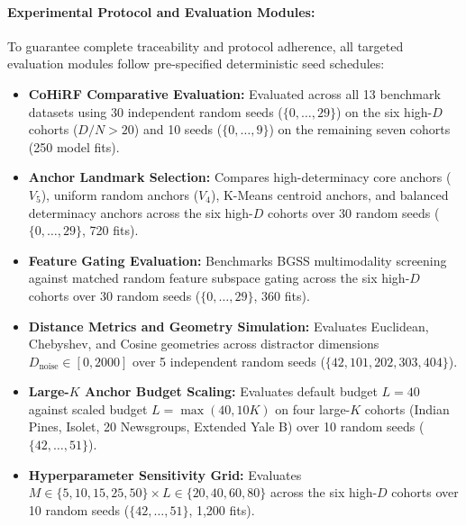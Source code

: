 \documentclass[pdflatex,sn-mathphys-num]{sn-jnl}
\theoremstyle{thmstyleone}
\theoremstyle{thmstyletwo}
\theoremstyle{thmstylethree}
\begin{document}
\paragraph{Experimental Protocol and Evaluation Modules:}
To guarantee complete traceability and protocol adherence, all targeted evaluation modules follow pre-specified deterministic seed schedules:
\begin{itemize}
 \item \textbf{CoHiRF Comparative Evaluation:} Evaluated across all 13 benchmark datasets using 30 independent random seeds ($\{0, \dots, 29\}$) on the six high-$D$ cohorts ($D/N > 20$) and 10 seeds ($\{0, \dots, 9\}$) on the remaining seven cohorts (250 model fits).
 \item \textbf{Anchor Landmark Selection:} Compares high-determinacy core anchors ($V_5$), uniform random anchors ($V_4$), K-Means centroid anchors, and balanced determinacy anchors across the six high-$D$ cohorts over 30 random seeds ($\{0, \dots, 29\}$, 720 fits).
 \item \textbf{Feature Gating Evaluation:} Benchmarks BGSS multimodality screening against matched random feature subspace gating across the six high-$D$ cohorts over 30 random seeds ($\{0, \dots, 29\}$, 360 fits).
 \item \textbf{Distance Metrics and Geometry Simulation:} Evaluates Euclidean, Chebyshev, and Cosine geometries across distractor dimensions $D_{\text{noise}} \in [0, 2000]$ over 5 independent random seeds ($\{42, 101, 202, 303, 404\}$).
 \item \textbf{Large-$K$ Anchor Budget Scaling:} Evaluates default budget $L=40$ against scaled budget $L=\max(40, 10K)$ on four large-$K$ cohorts (Indian Pines, Isolet, 20 Newsgroups, Extended Yale B) over 10 random seeds ($\{42, \dots, 51\}$).
 \item \textbf{Hyperparameter Sensitivity Grid:} Evaluates $M \in \{5, 10, 15, 25, 50\} \times L \in \{20, 40, 60, 80\}$ across the six high-$D$ cohorts over 10 random seeds ($\{42, \dots, 51\}$, 1,200 fits).
\end{itemize}
\end{document}
